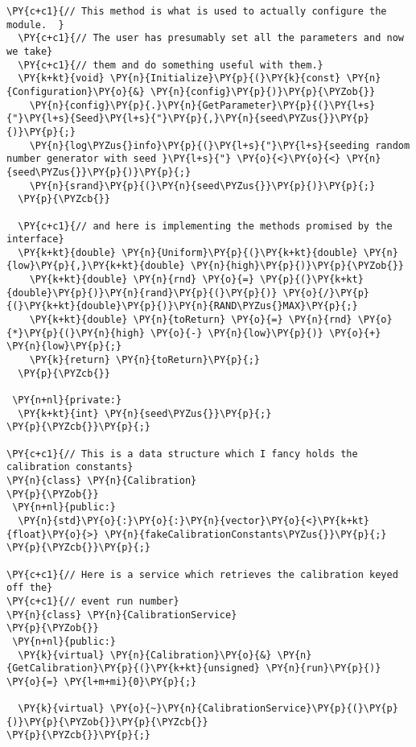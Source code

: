 \begin{Verbatim}[commandchars=\\\{\}]
  \PY{c+c1}{// This method is what is used to actually configure the module.  }
  \PY{c+c1}{// The user has presumably set all the parameters and now we take}
  \PY{c+c1}{// them and do something useful with them.}
  \PY{k+kt}{void} \PY{n}{Initialize}\PY{p}{(}\PY{k}{const} \PY{n}{Configuration}\PY{o}{&} \PY{n}{config}\PY{p}{)}\PY{p}{\PYZob{}}
    \PY{n}{config}\PY{p}{.}\PY{n}{GetParameter}\PY{p}{(}\PY{l+s}{"}\PY{l+s}{Seed}\PY{l+s}{"}\PY{p}{,}\PY{n}{seed\PYZus{}}\PY{p}{)}\PY{p}{;}
    \PY{n}{log\PYZus{}info}\PY{p}{(}\PY{l+s}{"}\PY{l+s}{seeding random number generator with seed }\PY{l+s}{"} \PY{o}{<}\PY{o}{<} \PY{n}{seed\PYZus{}}\PY{p}{)}\PY{p}{;}
    \PY{n}{srand}\PY{p}{(}\PY{n}{seed\PYZus{}}\PY{p}{)}\PY{p}{;}
  \PY{p}{\PYZcb{}}

  \PY{c+c1}{// and here is implementing the methods promised by the interface}
  \PY{k+kt}{double} \PY{n}{Uniform}\PY{p}{(}\PY{k+kt}{double} \PY{n}{low}\PY{p}{,}\PY{k+kt}{double} \PY{n}{high}\PY{p}{)}\PY{p}{\PYZob{}}
    \PY{k+kt}{double} \PY{n}{rnd} \PY{o}{=} \PY{p}{(}\PY{k+kt}{double}\PY{p}{)}\PY{n}{rand}\PY{p}{(}\PY{p}{)} \PY{o}{/}\PY{p}{(}\PY{k+kt}{double}\PY{p}{)}\PY{n}{RAND\PYZus{}MAX}\PY{p}{;}
    \PY{k+kt}{double} \PY{n}{toReturn} \PY{o}{=} \PY{n}{rnd} \PY{o}{*}\PY{p}{(}\PY{n}{high} \PY{o}{-} \PY{n}{low}\PY{p}{)} \PY{o}{+} \PY{n}{low}\PY{p}{;}
    \PY{k}{return} \PY{n}{toReturn}\PY{p}{;}
  \PY{p}{\PYZcb{}}

 \PY{n+nl}{private:}
  \PY{k+kt}{int} \PY{n}{seed\PYZus{}}\PY{p}{;}
\PY{p}{\PYZcb{}}\PY{p}{;}

\PY{c+c1}{// This is a data structure which I fancy holds the calibration constants}
\PY{n}{class} \PY{n}{Calibration}
\PY{p}{\PYZob{}}
 \PY{n+nl}{public:}
  \PY{n}{std}\PY{o}{:}\PY{o}{:}\PY{n}{vector}\PY{o}{<}\PY{k+kt}{float}\PY{o}{>} \PY{n}{fakeCalibrationConstants\PYZus{}}\PY{p}{;}
\PY{p}{\PYZcb{}}\PY{p}{;}

\PY{c+c1}{// Here is a service which retrieves the calibration keyed off the}
\PY{c+c1}{// event run number}
\PY{n}{class} \PY{n}{CalibrationService}
\PY{p}{\PYZob{}}
 \PY{n+nl}{public:}
  \PY{k}{virtual} \PY{n}{Calibration}\PY{o}{&} \PY{n}{GetCalibration}\PY{p}{(}\PY{k+kt}{unsigned} \PY{n}{run}\PY{p}{)} \PY{o}{=} \PY{l+m+mi}{0}\PY{p}{;}

  \PY{k}{virtual} \PY{o}{~}\PY{n}{CalibrationService}\PY{p}{(}\PY{p}{)}\PY{p}{\PYZob{}}\PY{p}{\PYZcb{}}
\PY{p}{\PYZcb{}}\PY{p}{;}


\end{Verbatim}
